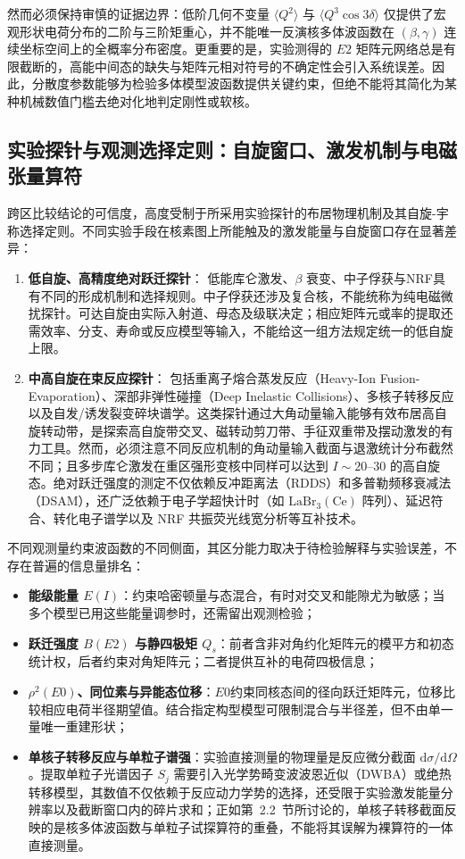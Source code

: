 然而必须保持审慎的证据边界：低阶几何不变量 $\langle Q^2 \rangle$ 与 $\langle Q^3 \cos 3\delta \rangle$ 仅提供了宏观形状电荷分布的二阶与三阶矩重心，并不能唯一反演核多体波函数在 $(\beta,\gamma)$ 连续坐标空间上的全概率分布密度。更重要的是，实验测得的 $E2$ 矩阵元网络总是有限截断的，高能中间态的缺失与矩阵元相对符号的不确定性会引入系统误差。因此，分散度参数能够为检验多体模型波函数提供关键约束，但绝不能将其简化为某种机械数值门槛去绝对化地判定刚性或软核。

\subsection{实验探针与观测选择定则：自旋窗口、激发机制与电磁张量算符}\label{sec:4-1-4}

跨区比较结论的可信度，高度受制于所采用实验探针的布居物理机制及其自旋-宇称选择定则。不同实验手段在核素图上所能触及的激发能量与自旋窗口存在显著差异：
\begin{enumerate}
\item \textbf{低自旋、高精度绝对跃迁探针}：
   低能库仑激发、$\beta$ 衰变、中子俘获与NRF具有不同的形成机制和选择规则。中子俘获还涉及复合核，不能统称为纯电磁微扰探针。可达自旋由实际入射道、母态及级联决定；相应矩阵元或率的提取还需效率、分支、寿命或反应模型等输入，不能给这一组方法规定统一的低自旋上限。
\item \textbf{中高自旋在束反应探针}：
   包括重离子熔合蒸发反应（Heavy-Ion Fusion-Evaporation）、深部非弹性碰撞（Deep Inelastic Collisions）、多核子转移反应以及自发/诱发裂变碎块谱学。这类探针通过大角动量输入能够有效布居高自旋转动带，是探索高自旋带交叉、磁转动剪刀带、手征双重带及摆动激发的有力工具。然而，必须注意不同反应机制的角动量输入截面与退激统计分布截然不同；且多步库仑激发在重区强形变核中同样可以达到 $I \sim 20\text{--}30$ 的高自旋态。绝对跃迁强度的测定不仅依赖反冲距离法（RDDS）和多普勒频移衰减法（DSAM），还广泛依赖于电子学超快计时（如 $\mathrm{LaBr}_3(\mathrm{Ce})$ 阵列）、延迟符合、转化电子谱学以及 NRF 共振荧光线宽分析等互补技术。
\end{enumerate}

不同观测量约束波函数的不同侧面，其区分能力取决于待检验解释与实验误差，不存在普遍的信息量排名：
\begin{itemize}
\item \textbf{能级能量 $E(I)$}：约束哈密顿量与态混合，有时对交叉和能隙尤为敏感；当多个模型已用这些能量调参时，还需留出观测检验；
\item \textbf{跃迁强度 $B(E2)$ 与静四极矩 $Q_s$}：前者含非对角约化矩阵元的模平方和初态统计权，后者约束对角矩阵元；二者提供互补的电荷四极信息；
\item \textbf{$\rho^2(E0)$、同位素与异能态位移}：$E0$约束同核态间的径向跃迁矩阵元，位移比较相应电荷半径期望值。结合指定构型模型可限制混合与半径差，但不由单一量唯一重建形状；
\item \textbf{单核子转移反应与单粒子谱强}：实验直接测量的物理量是反应微分截面 $\mathrm{d}\sigma/\mathrm{d}\Omega$。提取单粒子光谱因子 $S_j$ 需要引入光学势畸变波波恩近似（DWBA）或绝热转移模型，其数值不仅依赖于反应动力学势的选择，还受限于实验激发能量分辨率以及截断窗口内的碎片求和；正如第~2.2~节所讨论的，单核子转移截面反映的是核多体波函数与单粒子试探算符的重叠，不能将其误解为裸算符的一体直接测量。
\end{itemize}

